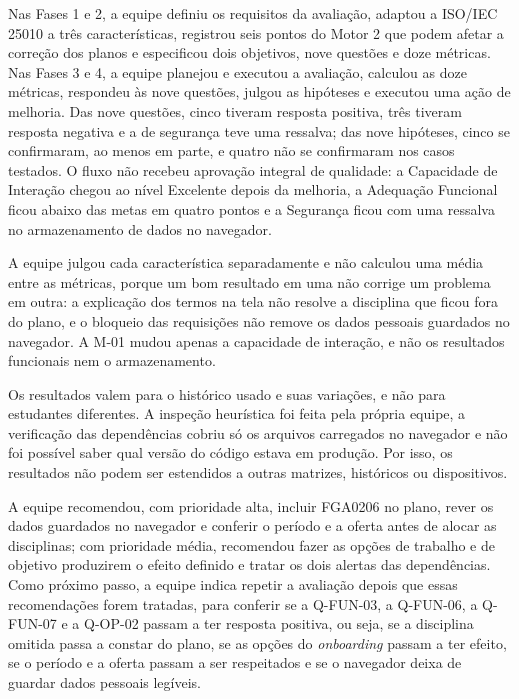 \documentclass[12pt]{article}
\begin{document}
Nas Fases 1 e 2, a equipe definiu os requisitos da avaliação, adaptou a ISO/IEC 25010
a três características, registrou seis pontos do Motor 2 que podem afetar a correção
dos planos e especificou dois objetivos, nove questões e doze métricas. Nas Fases 3 e
4, a equipe planejou e executou a avaliação, calculou as doze métricas, respondeu às
nove questões, julgou as hipóteses e executou uma ação de melhoria. Das nove questões,
cinco tiveram resposta positiva, três tiveram resposta negativa e a de segurança teve
uma ressalva; das nove hipóteses, cinco se confirmaram, ao menos em parte, e quatro
não se confirmaram nos casos testados. O fluxo não
recebeu aprovação integral de qualidade: a Capacidade de Interação chegou ao nível Excelente
depois da melhoria, a Adequação Funcional ficou abaixo das metas em quatro pontos e a
Segurança ficou com uma ressalva no armazenamento de dados no navegador.

A equipe julgou cada característica separadamente e não calculou uma média entre as
métricas, porque um bom resultado em uma não corrige um problema em outra: a
explicação dos termos na tela não resolve a disciplina que ficou fora do plano, e o
bloqueio das requisições não remove os dados pessoais guardados no navegador. A
M-01 mudou apenas a capacidade de interação, e não os resultados funcionais nem o
armazenamento.

Os resultados valem para o histórico usado e suas variações, e não para estudantes
diferentes. A inspeção heurística foi feita pela própria equipe, a verificação
das dependências cobriu só os arquivos carregados no navegador e não foi possível
saber qual versão do código estava em produção. Por isso, os resultados não podem
ser estendidos a outras matrizes, históricos ou dispositivos.

A equipe recomendou, com prioridade alta, incluir FGA0206 no plano, rever os dados
guardados no navegador e conferir o período e a oferta antes de alocar as
disciplinas; com prioridade média, recomendou fazer as opções de trabalho e de
objetivo produzirem o efeito definido e tratar os dois alertas das dependências. Como
próximo passo, a equipe indica repetir a avaliação depois que essas recomendações
forem tratadas, para conferir se a Q-FUN-03, a Q-FUN-06, a Q-FUN-07 e a Q-OP-02
passam a ter resposta positiva, ou seja, se a disciplina omitida passa a constar do
plano, se as opções do \textit{onboarding} passam a ter efeito, se o período e a
oferta passam a ser respeitados e se o navegador deixa de guardar dados pessoais
legíveis.
\end{document}
